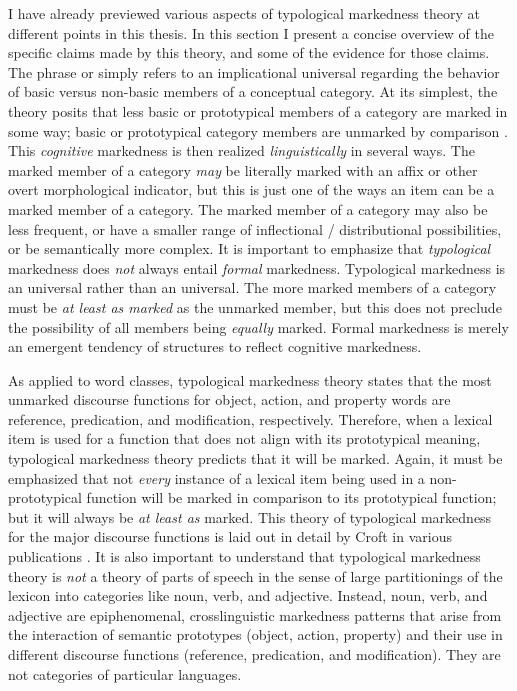 I have already previewed various aspects of typological markedness theory at different points in this thesis. In this section I present a concise overview of the specific claims made by this theory, and some of the evidence for those claims. The phrase  or  simply refers to an implicational universal regarding the behavior of basic versus non-basic members of a conceptual category. At its simplest, the theory posits that less basic or prototypical members of a category are marked in some way; basic or prototypical category members are unmarked by comparison \parencite{Greenberg1966}. This \emph{cognitive} markedness is then realized \emph{linguistically} in several ways. The marked member of a category \emph{may} be literally marked with an affix or other overt morphological indicator, but this is just one of the ways an item can be a marked member of a category. The marked member of a category may also be less frequent, or have a smaller range of inflectional / distributional possibilities, or be semantically more complex. It is important to emphasize that \emph{typological} markedness does \emph{not} always entail \emph{formal} markedness. Typological markedness is an  universal rather than an  universal. The more marked members of a category must be \emph{at least as marked} as the unmarked member, but this does not preclude the possibility of all members being \emph{equally} marked. Formal markedness is merely an emergent tendency of structures to reflect cognitive markedness.

As applied to word classes, typological markedness theory states that the most unmarked discourse functions for object, action, and property words are reference, predication, and modification, respectively. Therefore, when a lexical item is used for a function that does not align with its prototypical meaning, typological markedness theory predicts that it will be marked. Again, it must be emphasized that not \emph{every} instance of a lexical item being used in a non-prototypical function will be marked in comparison to its prototypical function; but it will always be \emph{at least as} marked. This theory of typological markedness for the major discourse functions is laid out in detail by Croft in various publications \parencites{Croft1991}{Croft2000}{Croft2001b}{CroftLier2012}. It is also important to understand that typological markedness theory is \emph{not} a theory of parts of speech in the sense of large partitionings of the lexicon into categories like noun, verb, and adjective. Instead, noun, verb, and adjective are epiphenomenal, crosslinguistic markedness patterns that arise from the interaction of semantic prototypes (object, action, property) and their use in different discourse functions (reference, predication, and modification). They are not categories of particular languages.

